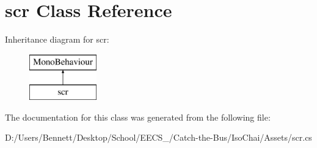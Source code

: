 \hypertarget{classscr}{}\section{scr Class Reference}
\label{classscr}
Inheritance diagram for scr\+:\begin{figure}[H]
\begin{center}
\leavevmode
\includegraphics[height=2.000000cm]{classscr}
\end{center}
\end{figure}


The documentation for this class was generated from the following file\+:\begin{DoxyCompactItemize}
\item 
D\+:/\+Users/\+Bennett/\+Desktop/\+School/\+E\+E\+C\+S\+\_/\+Catch-\/the-\/\+Bus/\+Iso\+Chai/\+Assets/scr.\+cs\end{DoxyCompactItemize}

